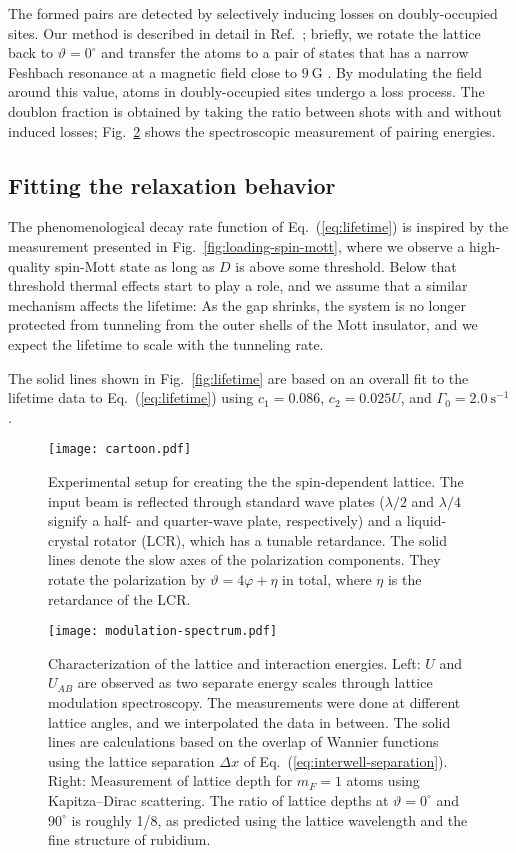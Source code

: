 The formed pairs are detected by selectively inducing losses on doubly-occupied sites. Our method is described in detail in Ref.~\cite{Chung21}; briefly, we rotate the lattice back to $\vartheta = 0^\circ$ and transfer the atoms to a pair of states that has a narrow Feshbach resonance at a magnetic field close to $9~\mathrm{G}$ \cite{kaufman2009radio}. By modulating the field around this value, atoms in doubly-occupied sites undergo a loss process. The doublon fraction is obtained by taking the ratio between shots with and without induced losses;  Fig.~\ref{fig:experimental-calibration} shows the spectroscopic measurement of pairing energies.


\subsection*{Fitting the relaxation behavior}
The phenomenological decay rate function of Eq.~(\ref{eq:lifetime}) is inspired by the measurement presented in Fig.~\ref{fig:loading-spin-mott}, where we observe a high-quality spin-Mott state as long as $D$ is above some threshold. Below that threshold thermal effects start to play a role, and we assume that a similar mechanism affects the lifetime:  As the gap shrinks, the system is no longer protected from tunneling from the outer shells of the Mott insulator, and we expect the lifetime to scale with the tunneling rate.

The solid lines shown in Fig.~\ref{fig:lifetime} are based on an overall fit to the lifetime data to Eq.~(\ref{eq:lifetime}) using $c_1 = 0.086$, $c_2 = 0.025U$, and $\Gamma_0 = 2.0~\mathrm{s^{-1}}$.

\begin{figure}
    \centering
    \texttt{[image: cartoon.pdf]}
    \caption{Experimental setup for creating the the spin-dependent lattice. The input beam is reflected through standard wave plates ($\lambda/2$ and $\lambda/4$ signify a half- and quarter-wave plate, respectively) and a liquid-crystal rotator (LCR), which has a tunable retardance. The solid lines denote the slow axes of the polarization components. They rotate the polarization by $\vartheta = 4\varphi + \eta$ in total, where $\eta$ is the retardance of the LCR.}
    \label{fig:cartoon}
\end{figure}

\begin{figure}
    \centering
    \texttt{[image: modulation-spectrum.pdf]}
    \caption{Characterization of the lattice and interaction energies. Left: $U$ and $U_{AB}$ are observed as two separate energy scales through lattice modulation spectroscopy. The measurements were done at different lattice angles, and we interpolated the data in between. The solid lines are calculations based on the overlap of Wannier functions using the lattice separation $\Delta x$ of Eq.~(\ref{eq:interwell-separation}). Right: Measurement of lattice depth for $m_F=1$ atoms using Kapitza--Dirac scattering.  The ratio of lattice depths at $\vartheta = 0^\circ$ and $90^\circ$ is roughly 1/8, as predicted using the lattice wavelength and the fine structure of rubidium.}
    \label{fig:experimental-calibration}
\end{figure}

